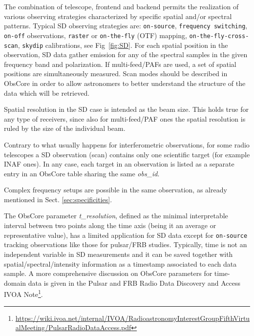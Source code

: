 \documentclass[11pt,a4paper]{ivoa}
\begin{document}
The combination of telescope, frontend and backend permits the realization of various observing strategies characterized by specific spatial and/or spectral patterns.
Typical SD observing strategies are: \texttt{on-source}, \texttt{frequency switching}, \texttt{on-off} observations, \texttt{raster} or \texttt{on-the-fly} (OTF) mapping, \texttt{on-the-fly-cross-scan}, \texttt{skydip} calibrations, see Fig~\ref{fig:SD}. For each spatial position in the observation, SD data gather emission for any of the spectral samples in the given frequency band and polarization.
If multi-feed/PAFs are used, a set of spatial positions are simultaneously measured. Scan modes should be described in ObsCore in order to allow astronomers to better understand the structure of the data which will be retrieved.

Spatial resolution in the SD case is intended as the beam size. This holds true for any type of receivers, since also for multi-feed/PAF ones the spatial resolution is ruled by the size of the individual beam.

Contrary to what usually happens for  interferometric observations, for some radio telescopes a SD observation (scan) contains only one scientific target (for example INAF ones). In any case, each target in an observation is listed as a separate entry in an ObsCore table sharing the same \emph{obs\_id}.

Complex frequency setups are possible in the same observation, as already mentioned in Sect. \ref{sec:specificities}.

The ObsCore parameter \emph{t\_resolution}, defined as the minimal interpretable interval between two points along the
time axis (being it an average or representative value), has a limited application for SD data except for \texttt{on-source} tracking observations like those for pulsar/FRB studies.
Typically, time is not an independent variable in SD measurements and it can be saved together with spatial/spectral/intensity
information as a timestamp associated to each data sample. 
A more comprehensive discussion on ObsCore parameters for time-domain data is given in the Pulsar
and FRB Radio Data Discovery and Access IVOA Note\footnote{\url{https://wiki.ivoa.net/internal/IVOA/RadioastronomyInterestGroupFifthVirtualMeeting/PulsarRadioDataAccess.pdf}}.
\end{document}
